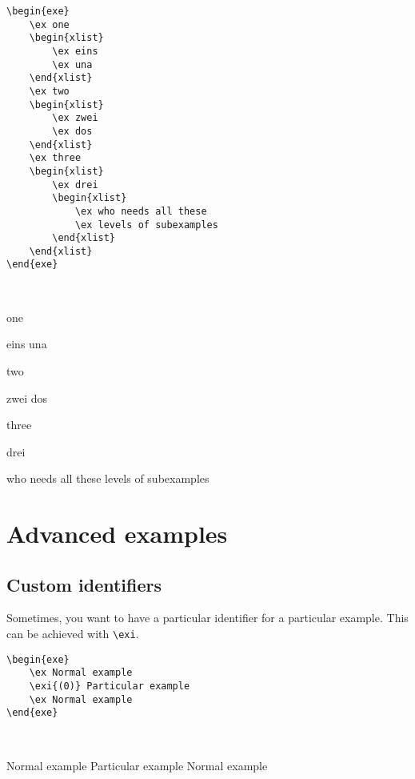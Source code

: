 \documentclass[output=paper]{langscibook}
\newcommand{\cmd}[1]{\texttt{\textbackslash#1}}
\begin{document}
\begin{minipage}[t]{.5\textwidth}
\begin{lstlisting}
\begin{exe}
    \ex one
    \begin{xlist}
        \ex eins
        \ex una
    \end{xlist}
    \ex two
    \begin{xlist}
        \ex zwei
        \ex dos
    \end{xlist}    
    \ex three
    \begin{xlist}
        \ex drei        
        \begin{xlist}
            \ex who needs all these
            \ex levels of subexamples
        \end{xlist}
    \end{xlist}
\end{exe}
 \end{lstlisting}
\end{minipage}~
\parbox[t]{.45\textwidth}{
\begin{exe}
    \ex one
    \begin{xlist}
        \ex eins
        \ex una
    \end{xlist}
    \ex two
    \begin{xlist}
        \ex zwei
        \ex dos
    \end{xlist}    
    \ex three
    \begin{xlist}
        \ex drei        
        \begin{xlist}
            \ex who needs all these
            \ex levels of subexamples
        \end{xlist}
    \end{xlist}
\end{exe}
}




\section{Advanced examples}
\subsection{Custom identifiers}
Sometimes, you want to have a particular identifier for a particular example. This can be achieved with \cmd{exi}.\medskip

\begin{minipage}[t]{.55\textwidth}
\begin{lstlisting}
\begin{exe}
    \ex Normal example
    \exi{(0)} Particular example
    \ex Normal example
\end{exe}
 \end{lstlisting}
\end{minipage}~
\parbox[t]{.45\textwidth}{
\begin{exe}
    \ex Normal example
     Particular example
    \ex Normal example
\end{exe}
}
\end{document}
